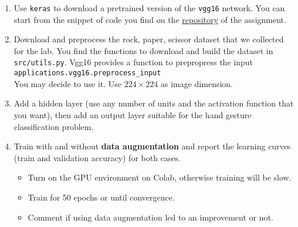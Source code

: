\documentclass[11pt]{scrartcl}
\begin{document}
\begin{enumerate}
\item Use \texttt{keras} to download a pretrained version of the \texttt{vgg16} network. You can start from the snippet of code you find on the \href{https://github.com/marshka/ml-20-21/tree/main/assignment\_2}{repository} of the assignment.
\item Download and preprocess the rock, paper, scissor dataset that we collected for the lab. You find the functions to download and build the dataset in \texttt{src/utils.py}. Vgg16 provides a function to prepropress the input\\
\texttt{applications.vgg16.preprocess\_input}\\
You may decide to use it.
Use $224 \times 224$ as image dimension.
\item Add a hidden layer (use any number of units and the activation function that you want), then add an output layer suitable for the hand gesture classification problem.
\item Train with and without \textbf{data augmentation} and report the learning curves (train and validation accuracy) for both cases.
\begin{itemize}
\item Turn on the GPU environment on Colab, otherwise training will be slow.
\item Train for 50 epochs or until convergence.
\item Comment if using data augmentation led to an improvement or not.
\end{itemize}
\end{enumerate}
\end{document}
